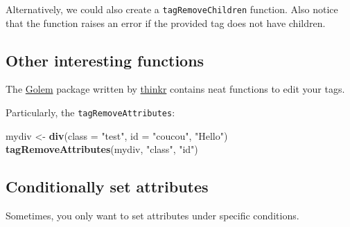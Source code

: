 \documentclass[
]{book}
\newenvironment{Shaded}{\begin{snugshade}}{\end{snugshade}}
\newcommand{\ControlFlowTok}[1]{\textcolor[rgb]{0.13,0.29,0.53}{\textbf{#1}}}
\newcommand{\DataTypeTok}[1]{\textcolor[rgb]{0.13,0.29,0.53}{#1}}
\newcommand{\KeywordTok}[1]{\textcolor[rgb]{0.13,0.29,0.53}{\textbf{#1}}}
\newcommand{\NormalTok}[1]{#1}
\newcommand{\OperatorTok}[1]{\textcolor[rgb]{0.81,0.36,0.00}{\textbf{#1}}}
\newcommand{\OtherTok}[1]{\textcolor[rgb]{0.56,0.35,0.01}{#1}}
\newcommand{\StringTok}[1]{\textcolor[rgb]{0.31,0.60,0.02}{#1}}
\begin{document}
Alternatively, we could also create a \texttt{tagRemoveChildren} function. Also notice that the function raises an error if the provided tag does not have children.

\hypertarget{other-interesting-functions}{%
\subsection{Other interesting functions}\label{other-interesting-functions}}

The \href{https://github.com/ThinkR-open/golem/blob/dev/inst/utils/golem_utils_ui.R}{Golem} package written by \href{https://thinkr.fr}{thinkr} contains neat functions to edit your tags.

Particularly, the \texttt{tagRemoveAttributes}:

\begin{Shaded}
\end{Shaded}

\begin{Shaded}
\begin{Highlighting}[]
\NormalTok{mydiv <-}\StringTok{ }\KeywordTok{div}\NormalTok{(}\DataTypeTok{class =} \StringTok{"test"}\NormalTok{, }\DataTypeTok{id =} \StringTok{"coucou"}\NormalTok{, }\StringTok{"Hello"}\NormalTok{)}
\KeywordTok{tagRemoveAttributes}\NormalTok{(mydiv, }\StringTok{"class"}\NormalTok{, }\StringTok{"id"}\NormalTok{)}
\end{Highlighting}
\end{Shaded}

\hypertarget{conditionally-set-attributes}{%
\subsection{Conditionally set attributes}\label{conditionally-set-attributes}}

Sometimes, you only want to set attributes under specific conditions.
\end{document}
